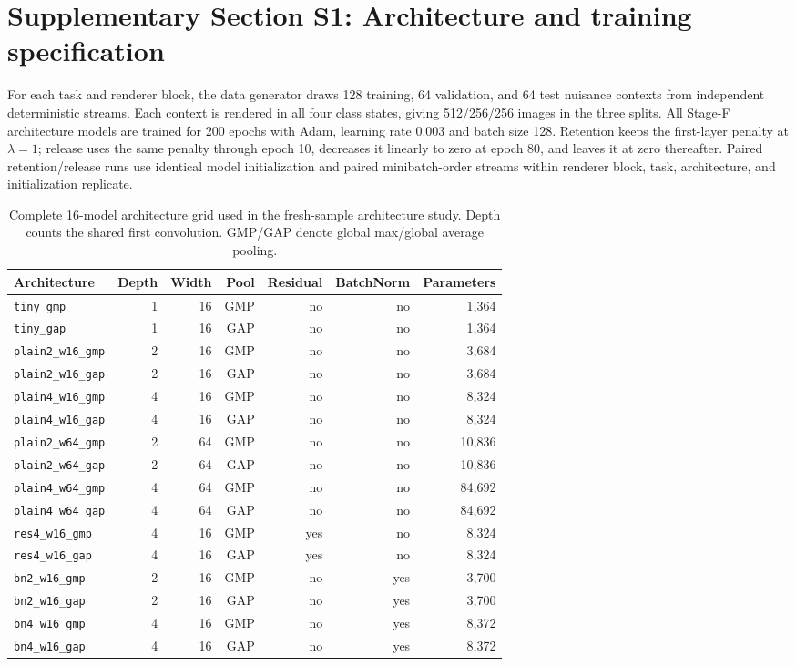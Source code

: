 \section*{Supplementary Section S1: Architecture and training specification}
\label{app:architecture-specification}

For each task and renderer block, the data generator draws 128 training, 64 validation, and 64 test nuisance contexts from independent deterministic streams. Each context is rendered in all four class states, giving 512/256/256 images in the three splits. All Stage-F architecture models are trained for 200 epochs with Adam, learning rate 0.003 and batch size 128. Retention keeps the first-layer penalty at $\lambda=1$; release uses the same penalty through epoch 10, decreases it linearly to zero at epoch 80, and leaves it at zero thereafter. Paired retention/release runs use identical model initialization and paired minibatch-order streams within renderer block, task, architecture, and initialization replicate.

\begin{table}[h]
\caption{Complete 16-model architecture grid used in the fresh-sample architecture study. Depth counts the shared first convolution. GMP/GAP denote global max/global average pooling.}
\label{tab:supp-architecture-grid}
\centering
\footnotesize
\setlength{\tabcolsep}{3pt}
\begin{tabular}{lrrrrrr}
\toprule
Architecture & Depth & Width & Pool & Residual & BatchNorm & Parameters \\
\midrule
\texttt{tiny\_gmp} & 1 & 16 & GMP & no & no & 1,364 \\
\texttt{tiny\_gap} & 1 & 16 & GAP & no & no & 1,364 \\
\texttt{plain2\_w16\_gmp} & 2 & 16 & GMP & no & no & 3,684 \\
\texttt{plain2\_w16\_gap} & 2 & 16 & GAP & no & no & 3,684 \\
\texttt{plain4\_w16\_gmp} & 4 & 16 & GMP & no & no & 8,324 \\
\texttt{plain4\_w16\_gap} & 4 & 16 & GAP & no & no & 8,324 \\
\texttt{plain2\_w64\_gmp} & 2 & 64 & GMP & no & no & 10,836 \\
\texttt{plain2\_w64\_gap} & 2 & 64 & GAP & no & no & 10,836 \\
\texttt{plain4\_w64\_gmp} & 4 & 64 & GMP & no & no & 84,692 \\
\texttt{plain4\_w64\_gap} & 4 & 64 & GAP & no & no & 84,692 \\
\texttt{res4\_w16\_gmp} & 4 & 16 & GMP & yes & no & 8,324 \\
\texttt{res4\_w16\_gap} & 4 & 16 & GAP & yes & no & 8,324 \\
\texttt{bn2\_w16\_gmp} & 2 & 16 & GMP & no & yes & 3,700 \\
\texttt{bn2\_w16\_gap} & 2 & 16 & GAP & no & yes & 3,700 \\
\texttt{bn4\_w16\_gmp} & 4 & 16 & GMP & no & yes & 8,372 \\
\texttt{bn4\_w16\_gap} & 4 & 16 & GAP & no & yes & 8,372 \\
\bottomrule
\end{tabular}
\end{table}

